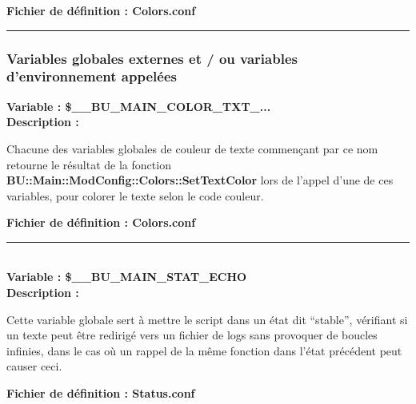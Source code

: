 \documentclass[a4paper,10pt]{article}
\begin{document}
\textbf{Fichier de définition : \color{path}Colors.conf}\\[1\baselineskip]



\color{sec3}\par\noindent\rule{\textwidth}{0.4pt}\color{text}

\color{sec3}
\subsubsection{Variables globales externes et / ou variables d'environnement appelées}\color{text}

\textbf{Variable : \color{vars}\$\_\_BU\_MAIN\_COLOR\_TXT\_...}\\[1\baselineskip]

\textbf{Description :}

\begin{justify}
    Chacune des variables globales de couleur de texte commençant par ce nom retourne le résultat de la fonction \textbf{\color{func}BU::Main::ModConfig::Colors::SetTextColor} lors de l'appel d'une de ces variables, pour colorer le texte selon le code couleur.
\end{justify}

\textbf{Fichier de définition : \color{path}Colors.conf}\\[1\baselineskip]



\color{vars}\par\noindent\rule{\textwidth}{0.4pt}\color{text}\\[1\baselineskip]

\textbf{Variable : \color{vars}\$\_\_BU\_MAIN\_STAT\_ECHO}\\[1\baselineskip]

\textbf{Description :}

\begin{justify}
    Cette variable globale sert à mettre le script dans un état dit ``stable'', vérifiant si un texte peut être redirigé vers un fichier de logs sans provoquer de boucles infinies, dans le cas où un rappel de la même fonction dans l'état précédent peut causer ceci.
\end{justify}

\textbf{Fichier de définition : \color{path}Status.conf}\\[1\baselineskip]


\end{document}
